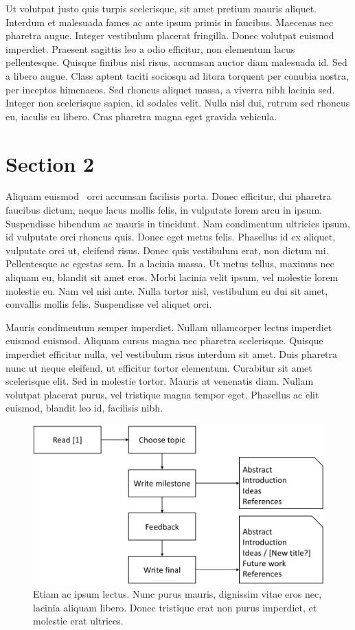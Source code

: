 \documentclass[a4paper, 10pt, conference]{ieeeconf}
\begin{document}
Ut volutpat justo quis turpis scelerisque, sit amet pretium mauris aliquet. Interdum et malesuada fames ac ante ipsum primis in faucibus. Maecenas nec pharetra augue. Integer vestibulum placerat fringilla. Donec volutpat euismod imperdiet. Praesent sagittis leo a odio efficitur, non elementum lacus pellentesque. Quisque finibus nisl risus, accumsan auctor diam malesuada id. Sed a libero augue. Class aptent taciti sociosqu ad litora torquent per conubia nostra, per inceptos himenaeos. Sed rhoncus aliquet massa, a viverra nibh lacinia sed. Integer non scelerisque sapien, id sodales velit. Nulla nisl dui, rutrum sed rhoncus eu, iaculis eu libero. Cras pharetra magna eget gravida vehicula.

\section{Section 2}

Aliquam euismod~\cite{fuggetta2014software} orci accumsan facilisis porta. Donec efficitur, dui pharetra faucibus dictum, neque lacus mollis felis, in vulputate lorem arcu in ipsum. Suspendisse bibendum ac mauris in tincidunt. Nam condimentum ultricies ipsum, id vulputate orci rhoncus quis. Donec eget metus felis. Phasellus id ex aliquet, vulputate orci ut, eleifend risus. Donec quis vestibulum erat, non dictum mi. Pellentesque ac egestas sem. In a lacinia massa. Ut metus tellus, maximus nec aliquam eu, blandit sit amet eros. Morbi lacinia velit ipsum, vel molestie lorem molestie eu. Nam vel nisi ante. Nulla tortor nisl, vestibulum eu dui sit amet, convallis mollis felis. Suspendisse vel aliquet orci.

Mauris condimentum semper imperdiet. Nullam ullamcorper lectus imperdiet euismod euismod. Aliquam cursus magna nec pharetra scelerisque. Quisque imperdiet efficitur nulla, vel vestibulum risus interdum sit amet. Duis pharetra nunc ut neque eleifend, ut efficitur tortor elementum. Curabitur sit amet scelerisque elit. Sed in molestie tortor. Mauris at venenatis diam. Nullam volutpat placerat purus, vel tristique magna tempor eget. Phasellus ac elit euismod, blandit leo id, facilisis nibh.

\begin{figure}
  \centering
  \includegraphics[width=.9\linewidth]{img/essay-process.png}
  \caption{Etiam ac ipsum lectus. Nunc purus mauris, dignissim vitae eros nec, lacinia aliquam libero. Donec tristique erat non purus imperdiet, et molestie erat ultrices.}
  \label{fig:essayProcess}
\end{figure}
\end{document}
